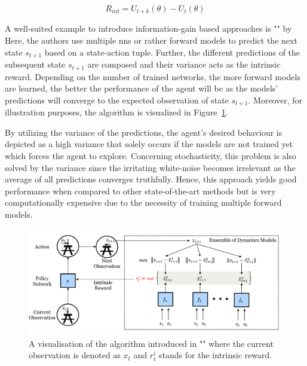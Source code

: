 \documentclass[draft,final]{vutinfth} %
\begin{document}
    \begin{equation}
        R_{int}=U_{t+k}(\theta) - U_t(\theta)
    \end{equation}

    A well-suited example to introduce information-gain based approaches is "" by \citeauthor{pathak_self-supervised_2019}
    Here, the authors use multiple \glspl{nn} or rather forward models to predict the next state $s_{t+1}$ based on a state-action tuple.
    Further, the different predictions of the subsequent state $s_{t+1}$ are composed and their variance acts as the intrinsic reward.
    Depending on the number of trained networks, the more forward models are learned, the better the performance of the agent will be as the models' predictions will converge to the expected observation of state $s_{t+1}$.
    Moreover, for illustration purposes, the algorithm is visualized in Figure~\ref{fig:ensemble_dissagreement}.

    By utilizing the variance of the predictions, the agent's desired behaviour is depicted as a high variance that solely occurs if the models are not trained yet which forces the agent to explore.
    Concerning stochasticity, this problem is also solved by the variance since the irritating white-noise becomes irrelevant as the average of all predictions converges truthfully.
    Hence, this approach yields good performance when compared to other state-of-the-art methods but is very computationally expensive due to the necessity of training multiple forward models.

    \begin{figure}[h]
        \centering
        \includegraphics[width=\textwidth]{figures/ensemble_dissagreement.png}
        \caption[A visualisation of the algorithm introduced in ""]{A visualisation of the algorithm introduced in "" where the current observation is denoted as $x_t$ and $r_t^i$ stands for the intrinsic reward.\protect\footnotemark}
        \label{fig:ensemble_dissagreement}
    \end{figure}
\end{document}
